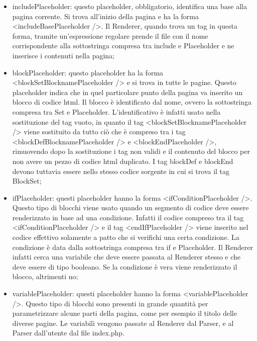 \begin{itemize}
    
	\item includePlaceholder: questo placeholder, obbligatorio, identifica una base alla pagina corrente. Si trova all'inizio della pagina e ha la forma <includeBasePlaceholder />. Il Renderer, quando trova un tag in questa forma, tramite un'espressione regolare prende il file con il nome corrispondente alla sottostringa compresa tra include e Placeholder e ne inserisce i contenuti nella pagina;
	
    \item blockPlaceholder: questo placeholder ha la forma <blockSetBlocknamePlaceholder /> e si trova in tutte le pagine. Questo placeholder indica che in quel particolare punto della pagina va inserito un blocco di codice html. Il blocco è identificato dal 
	nome, ovvero la sottostringa compresa tra Set e Placeholder. L'identificativo è infatti usato nella sostituzione del tag vuoto, in quanto il tag <blockSetBlocknamePlaceholder /> viene sostituito da tutto ciò che è compreso tra i tag <blockDefBlocknamePlaceholder /> 
	e <blockEndPlaceholder />, rimuovendo dopo la sostituzione i tag non validi e il contenuto del blocco per non avere un pezzo di codice html duplicato. I tag blockDef e blockEnd devono tuttavia essere nello stesso codice 
	sorgente in cui si trova il tag BlockSet;
	
	\item ifPlaceholder: questi placeholder hanno la forma <ifConditionPlaceholder />. Questo tipo di blocchi viene usato quando un segmento di codice deve essere renderizzato in base ad una condizione. Infatti il codice compreso tra il tag <ifConditionPlaceholder /> 
	e il tag <endIfPlaceholder /> viene inserito nel codice effettivo solamente a patto che si verifichi una certa condizione. La condizione è data dalla sottostringa compresa tra if e Placeholder. Il Renderer infatti cerca una variabile che deve essere passata al Renderer stesso e che deve essere di tipo booleano. Se la condizione è vera viene renderizzato il blocco, altrimenti no;
	
	\item variablePlaceholder: questi placeholder hanno la forma <variablePlaceholder />. Questo tipo di blocchi sono presenti in grande quantità per parametrizzare alcune parti della pagina, come per esempio il titolo delle diverse pagine. Le variabili vengono 
	passate al Renderer dal Parser, e al Parser dall'utente dal file index.php.
	
\end{itemize}

